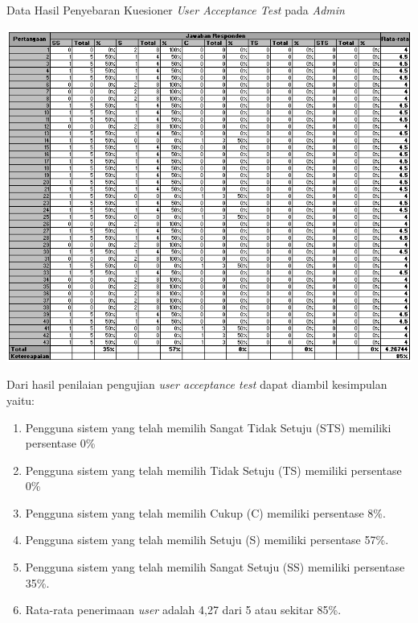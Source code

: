 \begin{table}[H]
	\centering
	\caption{Data Hasil Penyebaran Kuesioner \textit{User Acceptance Test} pada \textit{Admin}}
	\includegraphics[width=1\textwidth]{gambar/Hasil_Admin}
\end{table}

Dari hasil penilaian pengujian \textit{user acceptance test} dapat diambil kesimpulan yaitu:

\begin{enumerate}
	\item Pengguna sistem yang telah memilih Sangat Tidak Setuju (STS) memiliki persentase 0\%
	\item Pengguna sistem yang telah memilih Tidak Setuju (TS) memiliki persentase 0\%
	\item Pengguna sistem yang telah memilih Cukup (C) memiliki persentase 8\%.
	\item Pengguna sistem yang telah memilih Setuju (S) memiliki persentase 57\%.
	\item Pengguna sistem yang telah memilih Sangat Setuju (SS) memiliki persentase 35\%.
	\item Rata-rata penerimaan \textit{user} adalah 4,27 dari 5 atau sekitar 85\%.
\end{enumerate}


